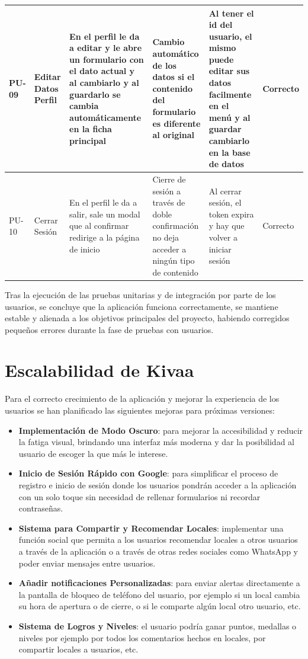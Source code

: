 \documentclass[a4paper,11pt]{article}
\begin{document}
\begin{table}[H]
\begin{tabular}{|p{1.3cm}|p{1.5cm}|p{3.5cm}|p{3.5cm}|p{3cm}|p{1.5cm}|}
    PU-09 & Editar Datos Perfil & En el perfil le da a editar y le abre un formulario con el dato actual y al cambiarlo y al guardarlo se cambia automáticamente en la ficha principal & Cambio automático de los datos si el contenido del formulario es diferente al original & Al tener el id del usuario, el mismo puede editar sus datos facilmente en el menú y al guardar cambiarlo en la base de datos & Correcto \\ \hline
    PU-10 & Cerrar Sesión & En el perfil le da a salir, sale un modal que al confirmar redirige a la página de inicio & Cierre de sesión a través de doble confirmación no deja acceder a ningún tipo de contenido  & Al cerrar sesión, el token expira y hay que volver a iniciar sesión  & Correcto \\ \hline
    \end{tabular}
\end{table}

Tras la ejecución de las pruebas unitarias y de integración por parte de los usuarios, se concluye que la aplicación funciona correctamente, se mantiene estable y alienada a los objetivos principales del proyecto, habiendo corregidos pequeños errores durante la fase de pruebas con usuarios.

\section{Escalabilidad de Kivaa}

Para el correcto crecimiento de la aplicación y mejorar la experiencia de los usuarios se han planificado las siguientes mejoras para próximas versiones:
\begin{itemize}
    \item \textbf{Implementación de Modo Oscuro}: para mejorar la accesibilidad y reducir la fatiga visual, brindando una interfaz más moderna y dar la posibilidad al usuario de escoger la que más le interese.
    \item \textbf{Inicio de Sesión Rápido con Google}: para simplificar el proceso de registro e inicio de sesión donde los usuarios pondrán acceder a la aplicación con un solo toque sin necesidad de rellenar formularios ni recordar contraseñas. 
    \item \textbf{Sistema para Compartir y Recomendar Locales}: implementar una función social que permita a los usuarios recomendar locales a otros usuarios a través de la aplicación o a través de otras redes sociales como WhatsApp y poder enviar mensajes entre usuarios.
    \item \textbf{Añadir notificaciones Personalizadas}: para enviar alertas directamente a la pantalla de bloqueo de teléfono del usuario, por ejemplo si un local cambia su hora de apertura o de cierre, o si le comparte algún local otro usuario, etc.
    \item \textbf{Sistema de Logros y Niveles}: el usuario podría ganar puntos, medallas o niveles por ejemplo por todos los comentarios hechos en locales, por compartir locales a usuarios, etc.
\end{itemize} 
\end{document}
